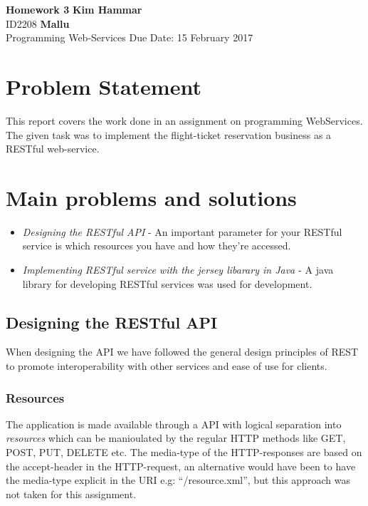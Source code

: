 \documentclass[a4paper, 11pt]{article}
\begin{document}
\noindent
\large\textbf{Homework 3} \hfill \textbf{Kim Hammar} \\
\normalsize ID2208 \hfill  \textbf{Mallu} \\
Programming Web-Services \hfill Due Date: 15 February 2017\\

\section*{Problem Statement}
This report covers the work done in an assignment on programming WebServices. The given task was to implement the flight-ticket reservation business as a RESTful web-service.

\section*{Main problems and solutions}
\begin{itemize}
\item \textit{Designing the RESTful API} - An important parameter for your RESTful service is which resources you have and how they're accessed.
  
\item \textit{Implementing RESTful service with the jersey libarary in Java \citep{jersey}} - A java library for developing RESTful services was used for development.
\end{itemize}

\subsection*{Designing the RESTful API}
When designing the API we have followed the general design principles of REST to promote interoperability with other services and ease of use for clients.

\subsubsection*{Resources}
The application is made available through a API with logical separation into \textit{resources} which can be manioulated by the regular HTTP methods like GET, POST, PUT, DELETE etc. The media-type of the HTTP-responses are based on the accept-header in the HTTP-request, an alternative would have been to have the media-type explicit in the URI e.g: ``/resource.xml'', but this approach was not taken for this assignment.
\end{document}
